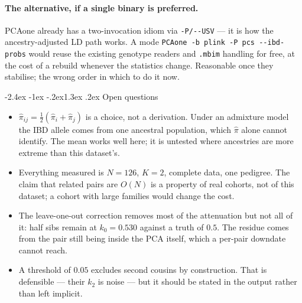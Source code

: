 \documentclass[10pt,a4paper]{article}
\makeatletter
\renewcommand\section{\@startsection{section}{1}{\z@}%
  {-2.4ex \@plus -1ex \@minus -.2ex}{1.3ex \@plus.2ex}%
  {\normalfont\large\bfseries\color{hdr}}}
\newenvironment{tightitem}{%
  \begin{itemize}\setlength{\itemsep}{1pt}\setlength{\parskip}{0pt}%
  \setlength{\topsep}{3pt}\setlength{\parsep}{0pt}}{\end{itemize}}
\makeatother
\begin{document}
\paragraph{The alternative, if a single binary is preferred.} PCAone already has a two-invocation idiom via
\texttt{-P/-{}-USV} --- it is how the ancestry-adjusted LD path works. A mode
\texttt{PCAone -b plink -P pcs -{}-ibd-probs} would reuse the existing genotype readers and \texttt{.mbim}
handling for free, at the cost of a rebuild whenever the statistics change. Reasonable once they stabilise;
the wrong order in which to do it now.

\section{Open questions}

\begin{tightitem}
  \item $\hat\pi_{ij}=\tfrac12(\hat\pi_i+\hat\pi_j)$ is a choice, not a derivation. Under an admixture model
  the IBD allele comes from one ancestral population, which $\hat\pi$ alone cannot identify. The mean works
  well here; it is untested where ancestries are more extreme than this dataset's.
  \item Everything measured is $N=126$, $K=2$, complete data, one pedigree. The claim that related pairs are
  $O(N)$ is a property of real cohorts, not of this dataset; a cohort with large families would change the
  cost.
  \item The leave-one-out correction removes most of the attenuation but not all of it: half sibs remain at
  $k_0=0.530$ against a truth of $0.5$. The residue comes from the pair still being inside the PCA itself,
  which a per-pair downdate cannot reach.
  \item A threshold of $0.05$ excludes second cousins by construction. That is defensible --- their $k_2$ is
  noise --- but it should be stated in the output rather than left implicit.
\end{tightitem}
\end{document}
